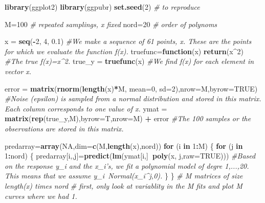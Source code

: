 \documentclass[]{article}
\newenvironment{Shaded}{\begin{snugshade}}{\end{snugshade}}
\newcommand{\KeywordTok}[1]{\textcolor[rgb]{0.13,0.29,0.53}{\textbf{#1}}}
\newcommand{\DataTypeTok}[1]{\textcolor[rgb]{0.13,0.29,0.53}{#1}}
\newcommand{\DecValTok}[1]{\textcolor[rgb]{0.00,0.00,0.81}{#1}}
\newcommand{\FloatTok}[1]{\textcolor[rgb]{0.00,0.00,0.81}{#1}}
\newcommand{\StringTok}[1]{\textcolor[rgb]{0.31,0.60,0.02}{#1}}
\newcommand{\CommentTok}[1]{\textcolor[rgb]{0.56,0.35,0.01}{\textit{#1}}}
\newcommand{\OtherTok}[1]{\textcolor[rgb]{0.56,0.35,0.01}{#1}}
\newcommand{\ControlFlowTok}[1]{\textcolor[rgb]{0.13,0.29,0.53}{\textbf{#1}}}
\newcommand{\OperatorTok}[1]{\textcolor[rgb]{0.81,0.36,0.00}{\textbf{#1}}}
\newcommand{\NormalTok}[1]{#1}
\begin{document}
\begin{Shaded}
\begin{Highlighting}[]
\KeywordTok{library}\NormalTok{(ggplot2)}
\KeywordTok{library}\NormalTok{(ggpubr)}
\KeywordTok{set.seed}\NormalTok{(}\DecValTok{2}\NormalTok{) }\CommentTok{# to reproduce}

\NormalTok{M=}\DecValTok{100} \CommentTok{# repeated samplings, x fixed }
\NormalTok{nord=}\DecValTok{20} \CommentTok{# order of polynoms}


\NormalTok{x =}\StringTok{ }\KeywordTok{seq}\NormalTok{(}\OperatorTok{-}\DecValTok{2}\NormalTok{, }\DecValTok{4}\NormalTok{, }\FloatTok{0.1}\NormalTok{) }\CommentTok{#We make a sequence of 61 points, x. These are the points for which we evaluate the function f(x).}
\NormalTok{truefunc=}\ControlFlowTok{function}\NormalTok{(x) }\KeywordTok{return}\NormalTok{(x}\OperatorTok{^}\DecValTok{2}\NormalTok{) }\CommentTok{#The true f(x)=x^2. }
\NormalTok{true_y =}\StringTok{ }\KeywordTok{truefunc}\NormalTok{(x) }\CommentTok{#We find f(x) for each element in vector x.}

\NormalTok{error =}\StringTok{ }\KeywordTok{matrix}\NormalTok{(}\KeywordTok{rnorm}\NormalTok{(}\KeywordTok{length}\NormalTok{(x)}\OperatorTok{*}\NormalTok{M, }\DataTypeTok{mean=}\DecValTok{0}\NormalTok{, }\DataTypeTok{sd=}\DecValTok{2}\NormalTok{),}\DataTypeTok{nrow=}\NormalTok{M,}\DataTypeTok{byrow=}\OtherTok{TRUE}\NormalTok{) }\CommentTok{#Noise (epsilon) is sampled from a normal distribution and stored in this matrix. Each column corresponds to one value of x.}
\NormalTok{ymat =}\StringTok{ }\KeywordTok{matrix}\NormalTok{(}\KeywordTok{rep}\NormalTok{(true_y,M),}\DataTypeTok{byrow=}\NormalTok{T,}\DataTypeTok{nrow=}\NormalTok{M) }\OperatorTok{+}\StringTok{ }\NormalTok{error }\CommentTok{#The 100 samples or the observations are stored in this matrix.}

\NormalTok{predarray=}\KeywordTok{array}\NormalTok{(}\OtherTok{NA}\NormalTok{,}\DataTypeTok{dim=}\KeywordTok{c}\NormalTok{(M,}\KeywordTok{length}\NormalTok{(x),nord))}
\ControlFlowTok{for}\NormalTok{ (i }\ControlFlowTok{in} \DecValTok{1}\OperatorTok{:}\NormalTok{M)}
\NormalTok{\{}
  \ControlFlowTok{for}\NormalTok{ (j }\ControlFlowTok{in} \DecValTok{1}\OperatorTok{:}\NormalTok{nord)}
\NormalTok{  \{}
\NormalTok{    predarray[i,,j]=}\KeywordTok{predict}\NormalTok{(}\KeywordTok{lm}\NormalTok{(ymat[i,]}\OperatorTok{~}\KeywordTok{poly}\NormalTok{(x, j,}\DataTypeTok{raw=}\OtherTok{TRUE}\NormalTok{)))}
    \CommentTok{#Based on the response y_i and the x_i's, we fit a polynomial model of degre 1,...,20. This means that we assume y_i~Normal(x_i^j,0). }
\NormalTok{  \}}
\NormalTok{\}}
\CommentTok{# M matrices of size length(x) times nord}
\CommentTok{# first, only look at variablity in the M fits and plot M curves where we had 1.}


\end{Highlighting}
\end{Shaded}
\end{document}
